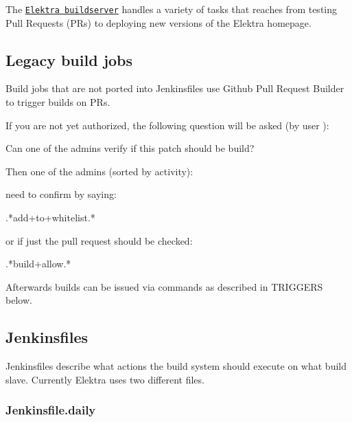 The \href{https://build.libelektra.org/}{\tt Elektra buildserver} handles a variety of tasks that reaches from testing Pull Requests (P\+Rs) to deploying new versions of the Elektra homepage.

\subsection*{Legacy build jobs}

Build jobs that are not ported into Jenkinsfiles use {\ttfamily Github Pull Request Builder} to trigger builds on PR\textquotesingle{}s.

If you are not yet authorized, the following question will be asked (by user )\+: \begin{DoxyVerb}Can one of the admins verify if this patch should be build?
\end{DoxyVerb}


Then one of the admins (sorted by activity)\+:


\begin{DoxyItemize}
\item 
\item 
\item 
\item 
\item 
\item 
\end{DoxyItemize}

need to confirm by saying\+: \begin{DoxyVerb}.*add\W+to\W+whitelist.*
\end{DoxyVerb}


or if just the pull request should be checked\+: \begin{DoxyVerb}.*build\W+allow.*
\end{DoxyVerb}


Afterwards builds can be issued via commands as described in {\ttfamily T\+R\+I\+G\+G\+E\+RS} below.

\subsection*{Jenkinsfiles}

Jenkinsfiles describe what actions the build system should execute on what build slave. Currently Elektra uses two different files.

\subsubsection*{Jenkinsfile.\+daily}



